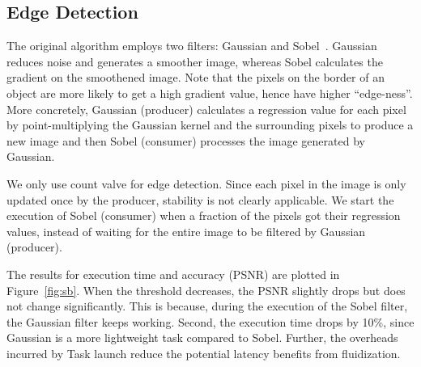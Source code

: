 

\subsection{Edge Detection}
\label{sec:sb}
The original algorithm employs two filters: Gaussian and Sobel~\cite{edgedetect}. Gaussian reduces noise and generates a smoother image, whereas Sobel calculates the gradient on the smoothened image. Note that the pixels on the border of an object are more likely to get a high gradient value, hence have higher ``edge-ness''. More concretely, Gaussian (producer) calculates a regression value for each pixel by point-multiplying the Gaussian kernel and the surrounding pixels to produce a new image and then Sobel (consumer) processes the image generated by Gaussian.

We only use count valve for edge detection. Since each pixel in the image is only updated once by the producer, stability is not clearly applicable. We start the execution of Sobel (consumer) when a fraction of the pixels got their regression values, instead of waiting for the entire image to be filtered by Gaussian (producer).

The results for execution time and accuracy (PSNR) are plotted in Figure~\ref{fig:sb}. When the threshold decreases, the PSNR slightly drops but does not change significantly. This is because, during the execution of the Sobel filter, the Gaussian filter keeps working. Second, the execution time drops by 10\%, since Gaussian is a more lightweight task compared to Sobel. Further, the overheads incurred by Task launch reduce the potential latency benefits from fluidization.


